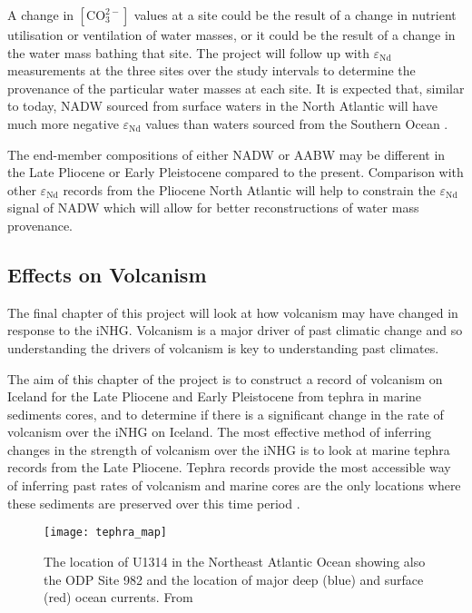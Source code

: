 A change in $\left[ \text{CO}_3^{2-}\right]$ values at a site could be the result of a change in nutrient utilisation or ventilation of water masses, or it could be the result of a change in the water mass bathing that site. The project will follow up with $\varepsilon_\text{Nd}$ measurements at the three sites over the study intervals to determine the provenance of the particular water masses at each site. It is expected that, similar to today, NADW sourced from surface waters in the North Atlantic will have much more negative $\varepsilon_\text{Nd}$ values than waters sourced from the Southern Ocean \citep{vandeflierdtNeodymiumOceansGlobal2016}. 

The end-member compositions of either NADW or AABW may be different in the Late Pliocene or Early Pleistocene compared to the present. Comparison with other $\varepsilon_\text{Nd}$ records from the Pliocene North Atlantic \citep{langIncursionsSouthernsourcedWater2016} will help to constrain the $\varepsilon_\text{Nd}$ signal of NADW which will allow for better reconstructions of water mass provenance.

\subsection{Effects on Volcanism}

The final chapter of this project will look at how volcanism may have changed in response to the iNHG. Volcanism is a major driver of past climatic change \citep{mckenzieContinentalArcVolcanism2016} and so understanding the drivers of volcanism is key to understanding past climates. 

The aim of this chapter of the project is to construct a record of volcanism on Iceland for the Late Pliocene and Early Pleistocene from tephra in marine sediments cores, and to determine if there is a significant change in the rate of volcanism over the iNHG on Iceland. The most effective method of inferring changes in the strength of volcanism over the iNHG is to look at marine tephra records from the Late Pliocene. Tephra records provide the most accessible way of inferring past rates of volcanism and marine cores are the only locations where these sediments are preserved over this time period \citep{cassidyConstructionVolcanicRecords2014}. 

\begin{figure}[h]
    \centering
    \texttt{[image: tephra\_map]}
    \caption{The location of U1314 in the Northeast Atlantic Ocean showing also the ODP Site 982 and the location of major deep (blue) and surface (red) ocean currents. From \citet{hernandez-almeidaSubsurfaceNorthAtlantic2014}}
    \label{fig:tephra_map}
\end{figure}

